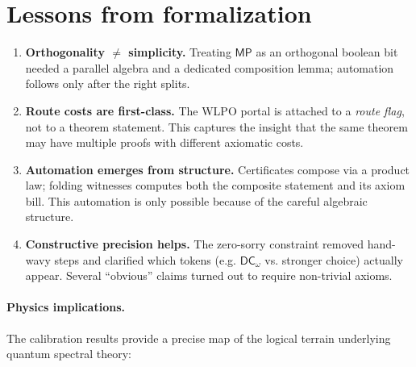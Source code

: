 \documentclass[11pt]{article}
\newcommand{\DCw}{\mathsf{DC}_{\omega}}
\newcommand{\MP}{\mathsf{MP}}
\theoremstyle{plain}
\theoremstyle{definition}
\theoremstyle{remark}
\begin{document}
\section{Lessons from formalization}\label{sec:lessons}
\begin{enumerate}
  \item \textbf{Orthogonality $\neq$ simplicity.}
  Treating $\MP$ as an orthogonal boolean bit needed a parallel algebra and a
  dedicated composition lemma; automation follows only after the right splits.
  
  \item \textbf{Route costs are first-class.}
  The WLPO portal is attached to a \emph{route flag}, not to a theorem statement.
  This captures the insight that the same theorem may have multiple proofs with different axiomatic costs.
  
  \item \textbf{Automation emerges from structure.}
  Certificates compose via a product law; folding witnesses computes both the
  composite statement and its axiom bill. This automation is only possible because of the careful algebraic structure.
  
  \item \textbf{Constructive precision helps.}
  The zero-sorry constraint removed hand-wavy steps and clarified which tokens
  (e.g. $\DCw$ vs. stronger choice) actually appear. Several ``obvious'' claims turned out to require non-trivial axioms.
\end{enumerate}

\paragraph{Physics implications.}
The calibration results provide a precise map of the logical terrain underlying quantum spectral theory:
\end{document}
